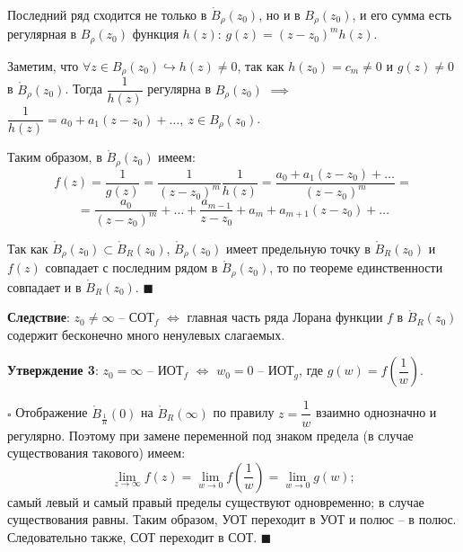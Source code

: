 \documentclass[12pt, a4paper, reqno]{article}
\begin{document}
    Последний ряд сходится не только в $\mathring B_{\rho}(z_0)$, но и в $B_{\rho}(z_0)$, и его
    сумма есть регулярная в $B_{\rho}(z_0)$ функция $h(z)$: $g(z) = (z - z_0)^m h(z)$.

    Заметим, что $\forall z \in B_{\rho}(z_0) \hookrightarrow h(z) \neq 0$, так как
    $h(z_0) = c_m \neq 0$ и $g(z) \neq 0$ в $\mathring B_{\rho}(z_0)$. Тогда $\dfrac{1}{h(z)}$
    регулярна в $B_{\rho}(z_0)$ $\implies$ $\dfrac{1}{h(z)} = a_0 + a_1(z - z_0) + \ldots,\ z \in
    B_{\rho}(z_0)$.

    Таким образом, в $\mathring B_{\rho}(z_0)$ имеем:
    \begin{equation*}
        f(z) = \frac{1}{g(z)} = \frac{1}{(z - z_0)^m}\frac{1}{h(z)} =
        \frac{a_0 + a_1(z - z_0) + \ldots}{(z - z_0)^m} =
    \end{equation*}
    \begin{equation*}
        = \frac{a_0}{(z - z_0)^m} + \ldots + \frac{a_{m - 1}}{z - z_0} + a_m + a_{m + 1}(z - z_0) +
        \ldots
    \end{equation*}

    Так как $\mathring B_{\rho}(z_0) \subset \mathring B_R(z_0)$, $\mathring B_{\rho}(z_0)$
    имеет предельную точку в $\mathring B_R(z_0)$ и $f(z)$ совпадает с последним рядом в
    $\mathring B_{\rho}(z_0)$, то по теореме единственности совпадает и в $\mathring B_{R}(z_0)$.
    $\blacksquare$

    \textbf{Следствие}: $z_0 \neq \infty$ -- СОТ$_f$ $\iff$ главная часть ряда Лорана функции
    $f$ в $\mathring B_R(z_0)$ содержит бесконечно много ненулевых слагаемых.

    \textbf{Утверждение 3}: $z_0 = \infty$ -- ИОТ$_f$ $\iff$ $w_0 = 0$ -- ИОТ$_g$, где
    $g(w) = f\left(\dfrac{1}{w}\right)$.

    $\square$ Отображение $\mathring B_{\frac{1}{R}}(0)$ на $\mathring B_R(\infty)$ по правилу
    $z = \dfrac{1}{w}$ взаимно однозначно и регулярно. Поэтому при замене переменной под знаком
    предела (в случае существования такового) имеем:
    \begin{equation*}
        \lim\limits_{z \to \infty} f(z) = \lim\limits_{w \to 0} f\left(\frac{1}{w}\right) =
        \lim\limits_{w \to 0} g(w);
    \end{equation*}
    самый левый и самый правый пределы существуют одновременно; в случае существования равны.
    Таким образом, УОТ переходит в УОТ и полюс -- в полюс. Следовательно также, СОТ переходит в СОТ.
    $\blacksquare$
\end{document}

